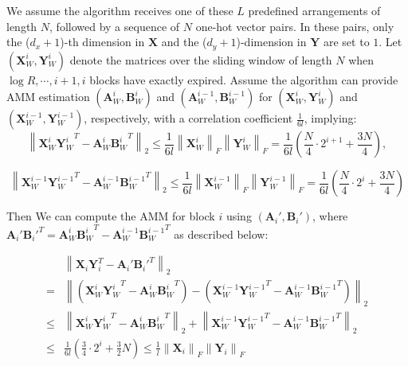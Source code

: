 We assume the algorithm receives one of these $L$ predefined arrangements of length $N$, followed by a sequence of $N$ one-hot vector pairs. In these pairs, only the ($d_x+1$)-th dimension in $\boldsymbol{X}$ and the ($d_y+1$)-dimension in $\boldsymbol{Y}$ are set to $1$. Let $(\boldsymbol{X}_W^i, \boldsymbol{Y}_W^i)$ denote the matrices over the sliding window of length $N$ when $\log{R},\cdots,i+1,i$ blocks have exactly expired. Assume the algorithm can provide AMM estimation $(\boldsymbol{A}_W^i, \boldsymbol{B}_W^i)$ and $(\boldsymbol{A}_W^{i-1}, \boldsymbol{B}_W^{i-1})$ for $(\boldsymbol{X}_W^i, \boldsymbol{Y}_W^i)$ and $(\boldsymbol{X}_W^{i-1}, \boldsymbol{Y}_W^{i-1})$, respectively, with a correlation coefficient $\frac{1}{6l}$, implying:
$$
\left\|\boldsymbol{X}_W^i {\boldsymbol{Y}_W^i}^T - \boldsymbol{A}_W^i {\boldsymbol{B}_W^i}^T\right\|_2
\leq \frac{1}{6l}
\left\|\boldsymbol{X}_W^i\right\|_F\left\|\boldsymbol{Y}_W^i\right\|_F = \frac{1}{6l}(\frac{N}{4}\cdot 2^{i+1}+\frac{3N}{4}),
$$

$$
\left\|\boldsymbol{X}_W^{i-1} {\boldsymbol{Y}_W^{i-1}}^T - \boldsymbol{A}_W^{i-1} {\boldsymbol{B}_W^{i-1}}^T\right\|_2
\leq \frac{1}{6l}
\left\|\boldsymbol{X}_W^{i-1}\right\|_F\left\|\boldsymbol{Y}_W^{i-1}\right\|_F = \frac{1}{6l}(\frac{N}{4}\cdot 2^{i}+\frac{3N}{4})
$$

Then We can compute the AMM for block $i$ using $(\boldsymbol{A}_i',\boldsymbol{B}_i')$, where $\boldsymbol{A}_i'{\boldsymbol{B}_i'}^T = \boldsymbol{A}_W^{i} {\boldsymbol{B}_W^{i}}^T - \boldsymbol{A}_W^{i-1} {\boldsymbol{B}_W^{i-1}}^T$ as described below:

\begin{align}
    & \left\|\boldsymbol{X}_i\boldsymbol{Y}_i^T- \boldsymbol{A}_i'{\boldsymbol{B}_i'}^T\right\|_2 \nonumber \\
    = & \left\|(\boldsymbol{X}_W^i {\boldsymbol{Y}_W^i}^T - \boldsymbol{A}_W^i {\boldsymbol{B}_W^i}^T) - (\boldsymbol{X}_W^{i-1} {\boldsymbol{Y}_W^{i-1}}^T - \boldsymbol{A}_W^{i-1} {\boldsymbol{B}_W^{i-1}}^T)\right\|_2 \nonumber \\
    \leq & \left\|\boldsymbol{X}_W^i {\boldsymbol{Y}_W^i}^T - \boldsymbol{A}_W^i {\boldsymbol{B}_W^i}^T\right\|_2 + \left\|\boldsymbol{X}_W^{i-1} {\boldsymbol{Y}_W^{i-1}}^T - \boldsymbol{A}_W^{i-1} {\boldsymbol{B}_W^{i-1}}^T\right\|_2 \nonumber \\
    \leq & \frac{1}{6l}(\frac{3}{4}\cdot 2^i+ \frac{3}{2}N) \leq \frac{1}{l}\left\|\boldsymbol{X}_i\right\|_F\left\|\boldsymbol{Y}_i\right\|_F \nonumber
\end{align}

